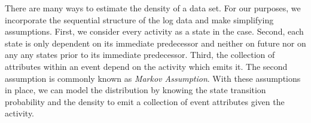\documentclass[./../../paper.tex]{subfiles}
\begin{document}


There are many ways to estimate the density of a data set. For our purposes, we incorporate the sequential structure of the log data and make simplifying assumptions. First, we consider every activity as a state in the case. Second, each state is only dependent on its immediate predecessor and neither on future nor on any any states prior to its immediate predecessor. Third, the collection of attributes within an event depend on the activity which emits it. The second assumption is commonly known as \emph{Markov Assumption}. With these assumptions in place, we can model the distribution by knowing the state transition probability and the density to emit a collection of event attributes given the activity. 


\end{document}
